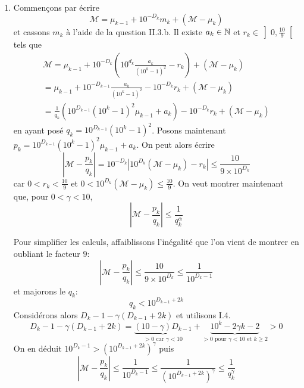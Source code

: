 \begin{enumerate}
 \item Commençons par écrire 
\begin{displaymath}
 \mathcal{M} = \mu_{k-1} + 10^{-D_k}m_k + (\mathcal{M}-\mu_k)
\end{displaymath}
et cassons $m_k$ à l'aide de la question II.3.b. Il existe $a_k\in\mathbb{N}$ et $r_k\in \left] 0,\frac{10}{9} \right[ $ tels que
\begin{multline*}
 \mathcal{M} = \mu_{k-1} + 10^{-D_k}\left(10^{d_k}\frac{a_k}{(10^k-1)^2}-r_k \right)  + (\mathcal{M}-\mu_k)\\
= \mu_{k-1} +10^{-D_{k-1}}\frac{a_k}{(10^k-1)^2}-10^{-D_k}r_k+ (\mathcal{M}-\mu_k)\\
= \frac{1}{q_k}\left(10^{D_{k-1}}(10^k-1)^2\mu_{k-1}+a_k \right) -10^{-D_k}r_k+ (\mathcal{M}-\mu_k)
\end{multline*}
en ayant posé $q_k=10^{D_{k-1}}(10^k-1)^2$.\newline
Posons maintenant $p_k= 10^{D_{k-1}}(10^k-1)^2\mu_{k-1}+a_k$. On peut alors écrire
\begin{displaymath}
 \left|\mathcal{M} - \frac{p_k}{q_k}\right|=10^{-D_k}\left|10^{D_k}(\mathcal{M}-\mu_k)-r_k\right|\leq \frac{10}{9\times 10^{D_k}}
\end{displaymath}
car $0<r_k<\frac{10}{9}$ et $0<10^{D_k}(\mathcal{M}-\mu_k)\leq\frac{10}{9}$.\newline
On veut montrer maintenant que, pour $0<\gamma<10$,
\begin{displaymath}
\left|\mathcal{M} - \frac{p_k}{q_k}\right|\leq \frac{1}{q_k^\alpha} 
\end{displaymath}

Pour simplifier les calculs, affaiblissons l'inégalité que l'on vient de montrer en oubliant le facteur $9$:
\begin{displaymath}
  \left\vert \mathcal{M} - \frac{p_k}{q_k}\right| \leq \frac{10}{9\times10^{D_k}}\leq \frac{1}{10^{D_k -1}}
\end{displaymath}
et majorons le $q_k$:
\begin{displaymath}
 q_k < 10^{D_{k-1}+2k} 
\end{displaymath}
Considérons alors $D_k - 1 -\gamma\left( D_{k-1}+2k\right)$ et utilisons I.4.
\begin{displaymath}
 D_k - 1 -\gamma\left( D_{k-1}+2k\right)
=
\underset{>0 \text{ car } \gamma <10}{\underbrace{(10-\gamma)D_{k-1}}}
+
\underset{>0 \text{ pour } \gamma <10 \text{ et } k\geq2}{\underbrace{10^{k}-2\gamma k -2}} >0
\end{displaymath}
On en déduit $10^{D_k -1}> \left( 10^{D_{k-1}+2k}\right)^\gamma$ puis
\begin{displaymath}
 \left\vert \mathcal{M} - \frac{p_k}{q_k}\right|
\leq \frac{1}{10^{D_k -1}}
\leq \frac{1}{\left( 10^{D_{k-1}+2k}\right)^\gamma}
\leq \frac{1}{q_k^\gamma}
\end{displaymath}
\end{enumerate}

